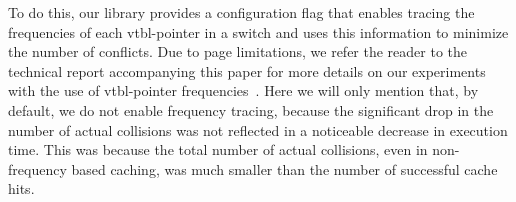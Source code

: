 To do this, our library provides a configuration flag that enables tracing the
frequencies of each vtbl-pointer in a switch and uses this information to 
minimize the number of conflicts. Due to page limitations, we refer the reader 
to the technical report accompanying this paper for more details on our 
experiments with the use of vtbl-pointer frequencies~\cite{TR}. Here we will only 
mention that, by default, we do not enable frequency tracing, because the 
significant drop in the number of actual collisions was not reflected in a 
noticeable decrease in execution time. This was because the total 
number of actual collisions, even in non-frequency based caching, was much smaller 
than the number of successful cache hits.
